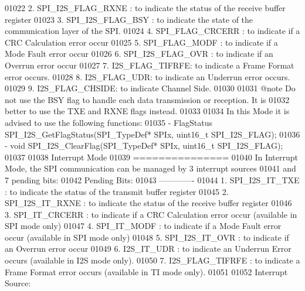 \begin{DoxyCode}
01022 \textcolor{comment}{     2. SPI\_I2S\_FLAG\_RXNE : to indicate the status of the receive buffer register}
01023 \textcolor{comment}{     3. SPI\_I2S\_FLAG\_BSY : to indicate the state of the communication layer of the SPI.}
01024 \textcolor{comment}{     4. SPI\_FLAG\_CRCERR : to indicate if a CRC Calculation error occur              }
01025 \textcolor{comment}{     5. SPI\_FLAG\_MODF : to indicate if a Mode Fault error occur}
01026 \textcolor{comment}{     6. SPI\_I2S\_FLAG\_OVR : to indicate if an Overrun error occur}
01027 \textcolor{comment}{     7. I2S\_FLAG\_TIFRFE: to indicate a Frame Format error occurs.}
01028 \textcolor{comment}{     8. I2S\_FLAG\_UDR: to indicate an Underrun error occurs.}
01029 \textcolor{comment}{     9. I2S\_FLAG\_CHSIDE: to indicate Channel Side.}
01030 \textcolor{comment}{}
01031 \textcolor{comment}{@note Do not use the BSY flag to handle each data transmission or reception.  It is}
01032 \textcolor{comment}{      better to use the TXE and RXNE flags instead.}
01033 \textcolor{comment}{}
01034 \textcolor{comment}{  In this Mode it is advised to use the following functions:}
01035 \textcolor{comment}{     - FlagStatus SPI\_I2S\_GetFlagStatus(SPI\_TypeDef* SPIx, uint16\_t SPI\_I2S\_FLAG);}
01036 \textcolor{comment}{     - void SPI\_I2S\_ClearFlag(SPI\_TypeDef* SPIx, uint16\_t SPI\_I2S\_FLAG);}
01037 \textcolor{comment}{}
01038 \textcolor{comment}{  Interrupt Mode}
01039 \textcolor{comment}{  ===============}
01040 \textcolor{comment}{  In Interrupt Mode, the SPI communication can be managed by 3 interrupt sources}
01041 \textcolor{comment}{  and 7 pending bits: }
01042 \textcolor{comment}{  Pending Bits:}
01043 \textcolor{comment}{  ------------- }
01044 \textcolor{comment}{     1. SPI\_I2S\_IT\_TXE : to indicate the status of the transmit buffer register}
01045 \textcolor{comment}{     2. SPI\_I2S\_IT\_RXNE : to indicate the status of the receive buffer register}
01046 \textcolor{comment}{     3. SPI\_IT\_CRCERR : to indicate if a CRC Calculation error occur (available in SPI mode only)     
             }
01047 \textcolor{comment}{     4. SPI\_IT\_MODF : to indicate if a Mode Fault error occur (available in SPI mode only)}
01048 \textcolor{comment}{     5. SPI\_I2S\_IT\_OVR : to indicate if an Overrun error occur}
01049 \textcolor{comment}{     6. I2S\_IT\_UDR : to indicate an Underrun Error occurs (available in I2S mode only).}
01050 \textcolor{comment}{     7. I2S\_FLAG\_TIFRFE : to indicate a Frame Format error occurs (available in TI mode only).}
01051 \textcolor{comment}{}
01052 \textcolor{comment}{  Interrupt Source:}

\end{DoxyCode}
